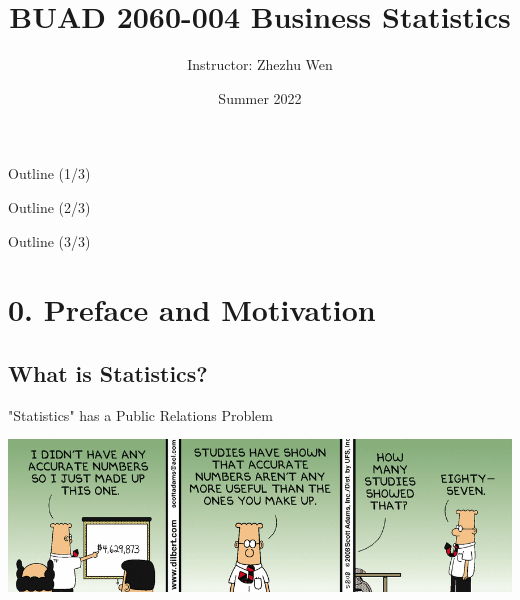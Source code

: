 \documentclass{beamer}
\title[LaTeX Workshop]{BUAD 2060-004 Business Statistics}
\author{Instructor: \linebreak Zhezhu Wen}
\institute{Winona State University, MN}
\date{Summer 2022}
\begin{document}
\begin{frame}
  \titlepage
\end{frame}




\begin{frame}{Outline (1/3)}

\begin{small}
\begin{multicols}{2}
  \tableofcontents[sections={1-3}]

\end{multicols}
\end{small}

\end{frame}


\begin{frame}{Outline (2/3)}

\begin{small}
\begin{multicols}{2}
  \tableofcontents[sections={4-5}]

\end{multicols}
\end{small}


\end{frame}


\begin{frame}{Outline (3/3)}

\begin{small}
\begin{multicols}{2}
  \tableofcontents[sections={6}]

\end{multicols}
\end{small}


\end{frame}



\section{0. Preface and Motivation}
\subsection{What is Statistics?} 


\begin{frame}{"Statistics" has a Public Relations Problem}

\begin{center}
\includegraphics[scale=0.48]{dilbertStatistics.png}
\end{center}


\end{frame}
\end{document}
